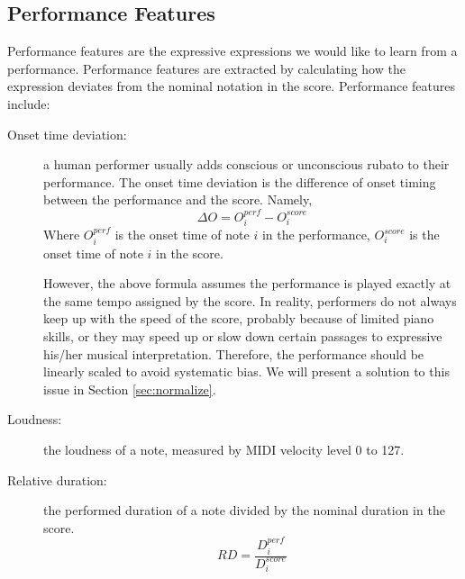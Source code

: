


\subsection{Performance Features}
   Performance features are the expressive expressions we would like to learn from a performance. Performance features are extracted by calculating how the expression deviates from the nominal notation in the score.
      Performance features include:
      \begin{description}
         \item [Onset time deviation:] 
            a human performer usually adds conscious or unconscious rubato to their performance. The onset time deviation is the difference of onset timing between the performance and the score. Namely,
            $$ \Delta O = O_i^{perf} - O_i^{score} $$ Where $O_i^{perf}$ is the onset time of note $i$ in the performance, $O_i^{score}$ is the onset time of note $i$ in the score. 

            However, the above formula assumes the performance is played exactly at the same tempo assigned by the score. In reality, performers do not always keep up with the speed of the score, probably because of limited piano skills, or they may speed up or slow down certain passages to expressive his/her musical interpretation. Therefore, the performance should be linearly scaled to avoid systematic bias. We will present a solution to this issue in Section \ref{sec:normalize}.
         \item [Loudness:] the loudness of a note, measured by MIDI velocity level 0 to 127.

         \item [Relative duration:]
            the performed duration of a note divided by the nominal duration in the score.
            $$ RD = \frac{ D_i^{perf}}{D_i^{score}}$$
      \end{description}

